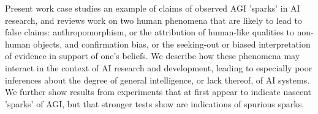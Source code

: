 \documentclass{article}
\theoremstyle{plain}
\theoremstyle{definition}
\theoremstyle{remark}
\begin{document}
Present work case studies an example of claims of observed AGI 'sparks' in AI research, and reviews work on two human phenomena that are likely to lead to false claims: anthropomorphism, or the attribution of human-like qualities to non-human objects, and confirmation bias, or the seeking-out or biased interpretation of evidence in support of one's beliefs. We describe how these phenomena may interact in the context of AI research and development, leading to especially poor inferences about the degree of general intelligence, or lack thereof, of AI systems. We further show results from experiments that at first appear to indicate nascent 'sparks' of AGI, but that stronger tests show are indications of spurious sparks.


\end{document}
